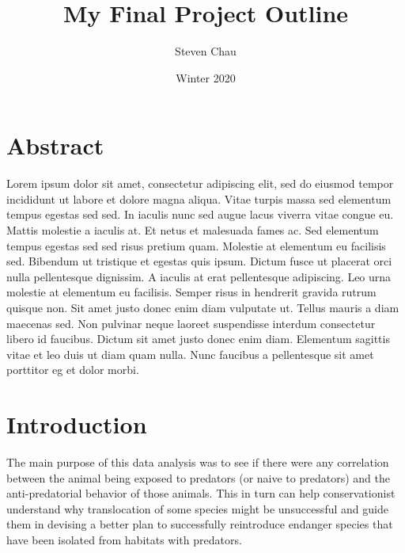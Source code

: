 \documentclass[letterpaper]{article}
\title {My Final Project Outline}
\author{Steven Chau}
\date{Winter 2020}
\begin{document}
\maketitle 
\section*{Abstract}
Lorem ipsum dolor sit amet, consectetur adipiscing elit, sed do eiusmod tempor incididunt ut labore et dolore magna aliqua. Vitae turpis massa sed elementum tempus egestas sed sed. In iaculis nunc sed augue lacus viverra vitae congue eu. Mattis molestie a iaculis at. Et netus et malesuada fames ac. Sed elementum tempus egestas sed sed risus pretium quam. Molestie at elementum eu facilisis sed. Bibendum ut tristique et egestas quis ipsum. Dictum fusce ut placerat orci nulla pellentesque dignissim. A iaculis at erat pellentesque adipiscing. Leo urna molestie at elementum eu facilisis. Semper risus in hendrerit gravida rutrum quisque non. Sit amet justo donec enim diam vulputate ut. Tellus mauris a diam maecenas sed. Non pulvinar neque laoreet suspendisse interdum consectetur libero id faucibus. Dictum sit amet justo donec enim diam. Elementum sagittis vitae et leo duis ut diam quam nulla. Nunc faucibus a pellentesque sit amet porttitor eg
et dolor morbi.
\section*{Introduction}
The main purpose of this data analysis was to see if there were any correlation between the animal being exposed to predators (or naive to predators) and the anti-predatorial behavior of those animals. This in turn can help conservationist understand why translocation of some species might be unsuccessful and guide them in devising a better plan to successfully reintroduce endanger species that have been isolated from habitats with predators.
\end{document}
